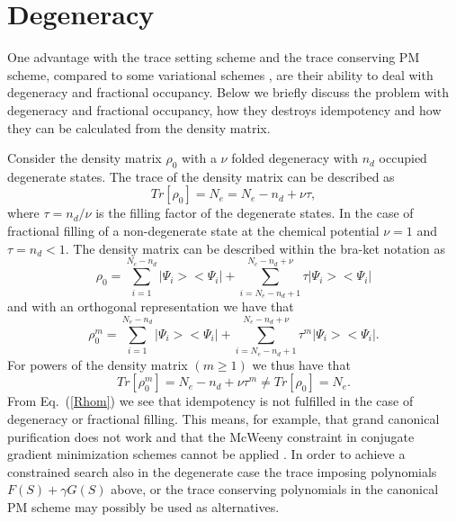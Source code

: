 \commentoutA{\documentclass[superbib,aps,prb,epsfig,floats,twocolumn]{revtex4}}
\begin{document}
\section{Degeneracy}

One advantage with the trace setting scheme and the trace
conserving PM scheme, compared to some variational schemes \cite{Li93},
are their ability to deal with degeneracy and fractional occupancy.
Below we briefly discuss the problem with degeneracy and fractional
occupancy, how they destroys idempotency and how they can be calculated
from the density matrix.

Consider the density matrix $\rho_0$  with a $\nu$ folded degeneracy
with $n_d$ occupied degenerate states. The trace of the density matrix
can be described as
\begin{equation}
Tr [ \rho_0  ] = N_e = N_e-n_d + \nu \tau,
\end{equation}
where $\tau = n_d/\nu$ is the filling factor of the degenerate states.
In the case of fractional filling of a non-degenerate state at the
chemical potential $\nu = 1$ and $\tau = n_d < 1$.
The density matrix can be described within the bra-ket notation as
\begin{equation}
\rho_0 = \sum_{ i=1 }^{ N_e - n_d } |\Psi_i >< \Psi_i | + 
\sum_{ i= N_e - n_d + 1 }^{ N_e - n_d + \nu } \tau | \Psi_i> < \Psi_i |
\end{equation}
and with an orthogonal representation we have that
\begin{equation}
\rho_0^m = \sum_{i=1}^{N_e-n_d} |\Psi_i><\Psi_i| + 
\sum_{i=N_e-n_d + 1}^{N_e - n_d +\nu} \tau^m |\Psi_i><\Psi_i|.
\end{equation}
For powers of the density matrix $(m \geq 1)$ we thus have that
\begin{equation} \label{Rhom}
Tr [ \rho_0^m  ] = N_e - n_d + \nu \tau^m \neq Tr  [ \rho_0  ] = N_e.
\end{equation}
From Eq.\ (\ref{Rhom}) we see that idempotency is not
fulfilled in the case of degeneracy or fractional filling. 
This means, for example, that grand canonical purification does not work and
that the McWeeny constraint in conjugate gradient
minimization schemes cannot be applied \cite{Li93}.
In order to achieve a constrained search also
in the degenerate case the trace imposing polynomials
$F(S) + \gamma G(S)$ above, or the trace conserving polynomials
in the canonical PM scheme may possibly be used as alternatives.
\end{document}
